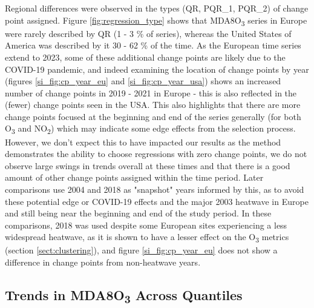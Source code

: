 \documentclass[journal abbreviation, manuscript]{copernicus}
\begin{document}
Regional differences were observed in the types (QR, PQR\_1, PQR\_2) of change point assigned. Figure \ref{fig:regression_type} shows that MDA8O\textsubscript{3} series in Europe were rarely described by QR (1 - 3 \% of series), whereas the United States of America was described by it 30 - 62 \% of the time. As the European time series extend to 2023, some of these additional change points are likely due to the COVID-19 pandemic, and indeed examining the location of change points by year (figures \ref{si_fig:cp_year_eu} and \ref{si_fig:cp_year_usa}) shows an increased number of change points in 2019 - 2021 in Europe - this is also reflected in the (fewer) change points seen in the USA. This also highlights that there are more change points focused at the beginning and end of the series generally (for both O\textsubscript{3} and NO\textsubscript{2}) which may indicate some edge effects from the selection process. However, we don't expect this to have impacted our results as the method demonstrates the ability to choose regressions with zero change points, we do not observe large swings in trends overall at these times and that there is a good amount of other change points assigned within the time period. Later comparisons use 2004 and 2018 as "snapshot" years informed by this, as to avoid these potential edge or COVID-19 effects and the major 2003 heatwave in Europe and still being near the beginning and end of the study period. In these comparisons, 2018 was used despite some European sites experiencing a less widespread heatwave, as it is shown to have a lesser effect on the O\textsubscript{3} metrics (section \ref{sect:clustering}), and figure \ref{si_fig:cp_year_eu} does not show a difference in change points from non-heatwave years.
 

\subsection{Trends in MDA8O\textsubscript{3} Across Quantiles} \label{sect:new_mda8_trends}
\end{document}
